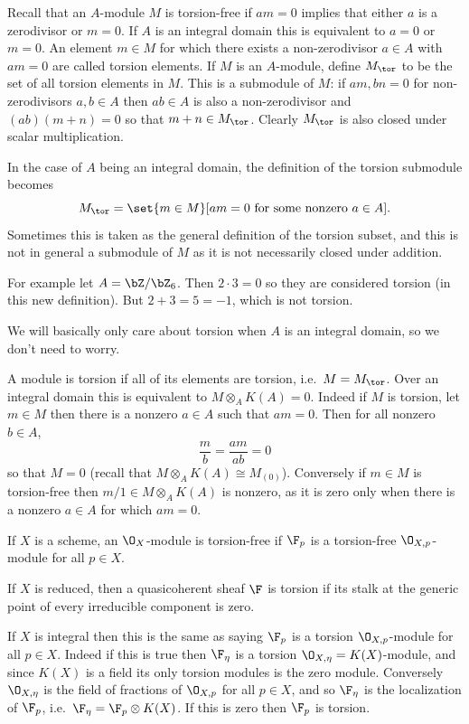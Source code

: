 \eexam

Recall that an $A$-module $M$ is {\emphcolor torsion-free} if $am=0$ implies that either $a$ is a zerodivisor or $m=0$.
If $A$ is an integral domain this is equivalent to $a=0$ or $m=0$.
An element $m\in M$ for which there exists a non-zerodivisor $a\in A$ with $am=0$ are called {\emphcolor torsion elements}.
If $M$ is an $A$-module, define $M_\tor$ to be the set of all torsion elements in $M$.
This is a submodule of $M$: if $am,bn=0$ for non-zerodivisors $a,b\in A$ then $ab\in A$ is also a non-zerodivisor and $(ab)(m+n)=0$ so that $m+n\in M_\tor$.
Clearly $M_\tor$ is also closed under scalar multiplication.

\bnote

    In the case of $A$ being an integral domain, the definition of the torsion submodule becomes
    $$ M_\tor = \set{m\in M}[am=0\hbox{ for some nonzero $a\in A$}] . $$
    Sometimes this is taken as the general definition of the torsion subset, and this is not in general a submodule of $M$ as it is not necessarily closed under addition.

    For example let $A=\bZ/\bZ_6$.
    Then $2\cdot3=0$ so they are considered torsion (in this new definition).
    But $2+3=5=-1$, which is not torsion.

    We will basically only care about torsion when $A$ is an integral domain, so we don't need to worry.

\enote

A module is {\emphcolor torsion} if all of its elements are torsion, i.e.\ $M=M_\tor$.
Over an integral domain this is equivalent to $M\otimes_AK(A)=0$.
Indeed if $M$ is torsion, let $m\in M$ then there is a nonzero $a\in A$ such that $am=0$.
Then for all nonzero $b\in A$,
$$ \frac mb = \frac{am}{ab} = 0 $$
so that $M=0$ (recall that $M\otimes_AK(A)\cong M_{(0)}$).
Conversely if $m\in M$ is torsion-free then $m/1\in M\otimes_AK(A)$ is nonzero, as it is zero only when there is a nonzero $a\in A$ for which $am=0$.

\bdefn

    If $X$ is a scheme, an $\O_X$-module is {\emphcolor torsion-free} if $\F_p$ is a torsion-free $\O_{X,p}$-module for all $p\in X$.

    If $X$ is reduced, then a quasicoherent sheaf $\F$ is {\emphcolor torsion} if its stalk at the generic point of every irreducible component is zero.

\edefn

If $X$ is integral then this is the same as saying $\F_p$ is a torsion $\O_{X,p}$-module for all $p\in X$.
Indeed if this is true then $\F_\eta$ is a torsion $\O_{X,\eta}=K(X)$-module, and since $K(X)$ is a field its only torsion modules is the zero module.
Conversely $\O_{X,\eta}$ is the field of fractions of $\O_{X,p}$ for all $p\in X$, and so $\F_\eta$ is the localization of $\F_p$, i.e.\ $\F_\eta=\F_p\otimes K(X)$.
If this is zero then $\F_p$ is torsion.

